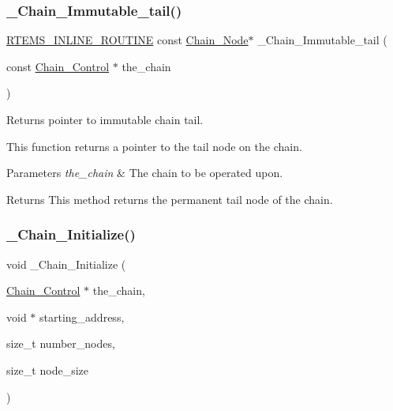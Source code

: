 \subsubsection{\texorpdfstring{\_Chain\_Immutable\_tail()}{\_Chain\_Immutable\_tail()}}
{\footnotesize\ttfamily \mbox{\hyperlink{group__RTEMSScoreBaseDefs_gac216239df231d5dbd15e3520b0b9313f}{R\+T\+E\+M\+S\+\_\+\+I\+N\+L\+I\+N\+E\+\_\+\+R\+O\+U\+T\+I\+NE}} const \mbox{\hyperlink{group__RTEMSScoreChain_ga0dd4bfcca1ac7f90de2842e447846d3d}{Chain\+\_\+\+Node}}$\ast$ \+\_\+\+Chain\+\_\+\+Immutable\+\_\+tail (\begin{DoxyParamCaption}\item[{const \mbox{\hyperlink{unionChain__Control}{Chain\+\_\+\+Control}} $\ast$}]{the\+\_\+chain }\end{DoxyParamCaption})}



Returns pointer to immutable chain tail. 

This function returns a pointer to the tail node on the chain.


\begin{DoxyParams}{Parameters}
{\em the\+\_\+chain} & The chain to be operated upon.\\
\hline
\end{DoxyParams}
\begin{DoxyReturn}{Returns}
This method returns the permanent tail node of the chain. 
\end{DoxyReturn}
\mbox{\label{group__RTEMSScoreChain_ga59b0dbda01fc9f0675bef62722627764}} 
\subsubsection{\texorpdfstring{\_Chain\_Initialize()}{\_Chain\_Initialize()}}
{\footnotesize\ttfamily void \+\_\+\+Chain\+\_\+\+Initialize (\begin{DoxyParamCaption}\item[{\mbox{\hyperlink{unionChain__Control}{Chain\+\_\+\+Control}} $\ast$}]{the\+\_\+chain,  }\item[{void $\ast$}]{starting\+\_\+address,  }\item[{size\+\_\+t}]{number\+\_\+nodes,  }\item[{size\+\_\+t}]{node\+\_\+size }\end{DoxyParamCaption})}



